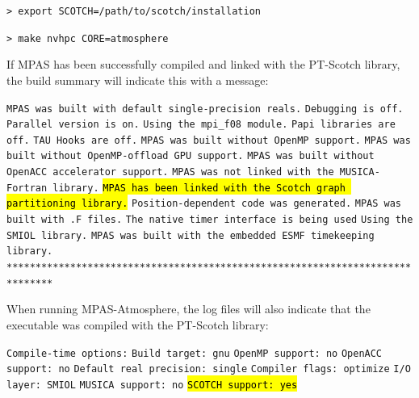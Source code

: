 {\vspace{12pt}
{\tt > export SCOTCH=/path/to/scotch/installation}

{\tt > make nvhpc CORE=atmosphere}
\vspace{12pt}

If MPAS has been successfully compiled and linked with the PT-Scotch library, the build summary will indicate this with a message:

\vspace{12pt}
\noindent {\tt *******************************************************************************} \newline
{\tt MPAS was built with default single-precision reals.} \newline
{\tt Debugging is off.} \newline
{\tt Parallel version is on.} \newline
{\tt Using the mpi\_f08 module.} \newline
{\tt Papi libraries are off.} \newline
{\tt TAU Hooks are off.} \newline
{\tt MPAS was built without OpenMP support.} \newline
{\tt MPAS was built without OpenMP-offload GPU support.} \newline
{\tt MPAS was built without OpenACC accelerator support.} \newline
{\tt MPAS was not linked with the MUSICA-Fortran library.} \newline
{\tt \hl{MPAS has been linked with the Scotch graph partitioning library.}} \newline
{\tt Position-dependent code was generated.} \newline
{\tt MPAS was built with .F files.} \newline
{\tt The native timer interface is being used} \newline
{\tt Using the SMIOL library.} \newline
{\tt MPAS was built with the embedded ESMF timekeeping library.} \newline
{\tt *******************************************************************************}
\vspace{12pt}

When running MPAS-Atmosphere, the log files will also indicate that the executable was compiled with the PT-Scotch library:

\vspace{12pt}
\noindent
{\tt Compile-time options:} \newline
{\tt   Build target: gnu} \newline
{\tt   OpenMP support: no} \newline
{\tt   OpenACC support: no} \newline
{\tt   Default real precision: single} \newline
{\tt   Compiler flags: optimize} \newline
{\tt   I/O layer: SMIOL} \newline
{\tt   MUSICA support: no} \newline
{\tt   \hl{SCOTCH support: yes}} \newline
\vspace{12pt}

}
